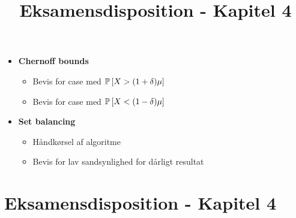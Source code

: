 
\title{Eksamensdisposition - Kapitel 4}


\maketitle

\begin{itemize}
\item \textbf{Chernoff bounds}
\begin{itemize}
  \item Bevis for case med $\P{X > (1 + \delta) \mu}$
  \item Bevis for case med $\P{X < (1 - \delta) \mu}$
\end{itemize}

\item \textbf{Set balancing}
\begin{itemize}
  \item Håndkørsel af algoritme
  \item Bevis for lav sandsynlighed for dårligt resultat
\end{itemize}
\end{itemize}


\newpage
\section{Eksamensdisposition - Kapitel 4}



